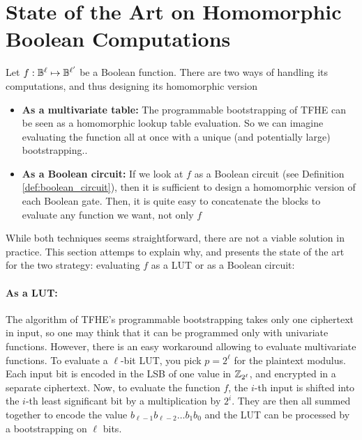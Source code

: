 \section{State of the Art on Homomorphic Boolean Computations}


Let $f : \mathbb{B}^\ell \mapsto \mathbb{B}^{\ell'}$ be a Boolean function. There are two ways of handling its computations, and thus designing its homomorphic version

\begin{itemize}
	\item \textbf{As a multivariate table: } The programmable bootstrapping of \gls{TFHE} can be seen as a homomorphic lookup table evaluation. So we can imagine evaluating the function all at once with a unique (and potentially large) bootstrapping..
	\item \textbf{As a Boolean circuit: } If we look at $f$ as a Boolean circuit (see Definition \ref{def:boolean_circuit}), then it is sufficient to design a homomorphic version of each Boolean gate. Then, it is quite easy to concatenate the blocks to evaluate any function we want, not only $f$
\end{itemize}


While both techniques seems straightforward, there are not a viable solution in practice. This section attemps to explain why, and presents the state of the art for the two strategy: evaluating $f$ as a \gls{LUT} or as a Boolean circuit:


\paragraph{As a \gls{LUT}:}


The algorithm of \gls{TFHE}'s programmable bootstrapping takes only one ciphertext in input, so one may think that it can be programmed only with univariate functions. However, there is an easy workaround allowing to evaluate multivariate functions.
To evaluate a $\ell$-bit \gls{LUT}, you pick $p = 2^\ell$ for the plaintext modulus. Each input bit is encoded in the \gls{LSB} of one value in $\mathbb{Z}_{2^\ell}$, and encrypted in a separate ciphertext. Now, to evaluate the function $f$, the $i$-th input is shifted into the $i$-th least significant bit by a multiplication by $2^i$. They are then all summed together to encode the value $b_{\ell-1}b_{\ell-2}\dots b_1b_0$ and the \gls{LUT} can be processed by a bootstrapping on $\ell$ bits.


